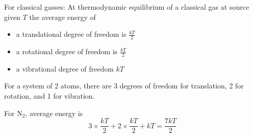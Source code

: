 \documentclass[12pt]{article}
\begin{document}
For classical gasses: At thermodynamic equilibrium of a classical gas at source given $T$ the average energy of

\begin{itemize}
	\item a translational degree of freedom is $\frac{kT}{2}$
	\item a rotational degree of freedom is $\frac{kT}{2}$
	\item a vibrational degree of freedom $kT$
\end{itemize}

\begin{ex}
	For a system of 2 atoms, there are 3 degrees of freedom for translation, 2 for rotation, and 1 for vibration.
\end{ex}

\begin{ex}
	For N$_2$, average energy is
	$$3\times \frac{kT}{2} + 2\times \frac{kT}{2} + kT = \frac{7kT}{2}$$
\end{ex}
\end{document}
